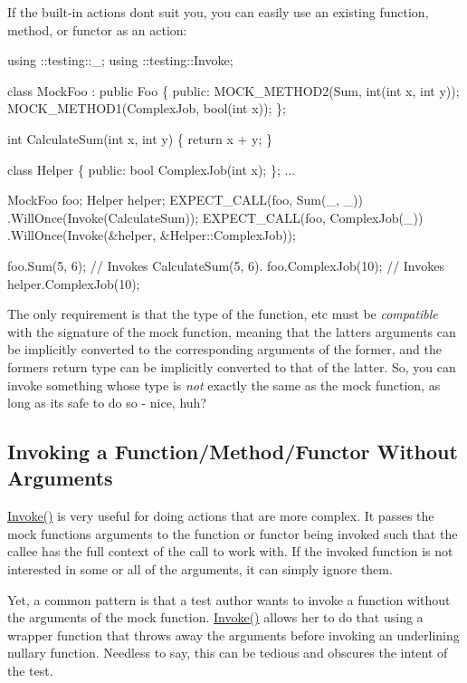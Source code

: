 If the built-\/in actions don\textquotesingle{}t suit you, you can easily use an existing function, method, or functor as an action\+:


\begin{DoxyCode}
using ::testing::\_;
using ::testing::Invoke;

class MockFoo : public Foo \{
 public:
  MOCK\_METHOD2(Sum, int(int x, int y));
  MOCK\_METHOD1(ComplexJob, bool(int x));
\};

int CalculateSum(int x, int y) \{ return x + y; \}

class Helper \{
 public:
  bool ComplexJob(int x);
\};
...

  MockFoo foo;
  Helper helper;
  EXPECT\_CALL(foo, Sum(\_, \_))
      .WillOnce(Invoke(CalculateSum));
  EXPECT\_CALL(foo, ComplexJob(\_))
      .WillOnce(Invoke(&helper, &Helper::ComplexJob));

  foo.Sum(5, 6);       // Invokes CalculateSum(5, 6).
  foo.ComplexJob(10);  // Invokes helper.ComplexJob(10);
\end{DoxyCode}


The only requirement is that the type of the function, etc must be {\itshape compatible} with the signature of the mock function, meaning that the latter\textquotesingle{}s arguments can be implicitly converted to the corresponding arguments of the former, and the former\textquotesingle{}s return type can be implicitly converted to that of the latter. So, you can invoke something whose type is {\itshape not} exactly the same as the mock function, as long as it\textquotesingle{}s safe to do so -\/ nice, huh?

\subsection*{Invoking a Function/\+Method/\+Functor Without Arguments}

{\ttfamily \hyperlink{namespacetesting_a12aebaf8363d49a383047529f798b694}{Invoke()}} is very useful for doing actions that are more complex. It passes the mock function\textquotesingle{}s arguments to the function or functor being invoked such that the callee has the full context of the call to work with. If the invoked function is not interested in some or all of the arguments, it can simply ignore them.

Yet, a common pattern is that a test author wants to invoke a function without the arguments of the mock function. {\ttfamily \hyperlink{namespacetesting_a12aebaf8363d49a383047529f798b694}{Invoke()}} allows her to do that using a wrapper function that throws away the arguments before invoking an underlining nullary function. Needless to say, this can be tedious and obscures the intent of the test.

